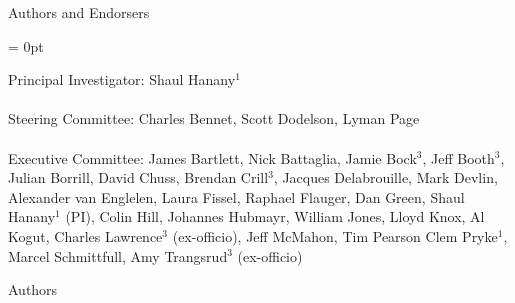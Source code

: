 \documentclass[PICOReport.tex]{subfiles}
\begin{document}

\LARGE{ \centerline{Authors and Endorsers}}
\vspace{0.3in}

\parindent = 0pt
\normalsize{Principal Investigator: Shaul Hanany$^1$ \\
\vspace{-7pt} \\
\normalsize{Steering Committee: Charles Bennet, Scott Dodelson, Lyman Page } \\
\vspace{-7pt} \\
\normalsize{Executive Committee: 
James Bartlett,
Nick Battaglia,
Jamie Bock$^3$, 
Jeff Booth$^3$,
Julian Borrill, 
David Chuss,
Brendan Crill$^3$, 
Jacques Delabrouille,
Mark Devlin, 
Alexander van Englelen,
Laura Fissel,
Raphael Flauger, 
Dan Green,
Shaul Hanany$^1$ (PI), 
Colin Hill,
Johannes Hubmayr,
William Jones, 
Lloyd Knox, 
Al Kogut, 
Charles Lawrence$^3$ (ex-officio), 
Jeff McMahon, 
Tim Pearson
Clem Pryke$^1$, 
Marcel Schmittfull,
Amy Trangsrud$^3$ (ex-officio) 
}
\\


\label{authorlist}

\Large  {\centerline {Authors}}

\footnotesize {

}}
\end{document}
